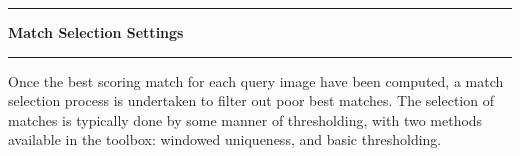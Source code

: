 \noindent\rule{\textwidth}{1pt}
\indent \textbf{Match Selection Settings}
\noindent\rule{\textwidth}{1pt}
\smallskip
\parbox{\textwidth}{Once the best scoring match for each query image have been computed, a match selection process is undertaken to filter out poor best matches. The selection of matches is typically done by some manner of thresholding, with two methods available in the toolbox: windowed uniqueness, and basic thresholding.}
